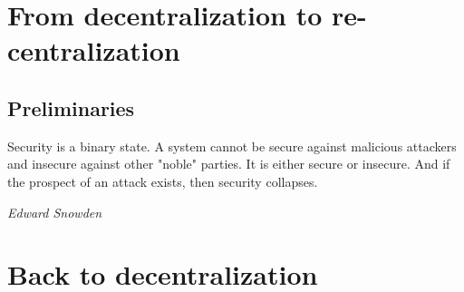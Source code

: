 \documentclass[10pt,a4paper]{book}
\begin{document}
%


%


%
\frontmatter

%

%
%
\mainmatter



\part{From decentralization to re-centralization}

\chapter{Preliminaries}
%
\epigraph{Security is a binary state. A system cannot be secure against malicious attackers and insecure against other "noble" parties. It is either secure or insecure. And if the prospect of an attack exists, then security collapses.}{\emph{Edward Snowden}}
%






\part{Back to decentralization}




%
%
\cleardoublepage
{}
{}
%
%
%
\printbibliography[filter=papers,title={Bibliography}]
\pagebreak
\printbibliography[heading=subbibintoc,type=misc,title={Web resources}]
%
\end{document}
